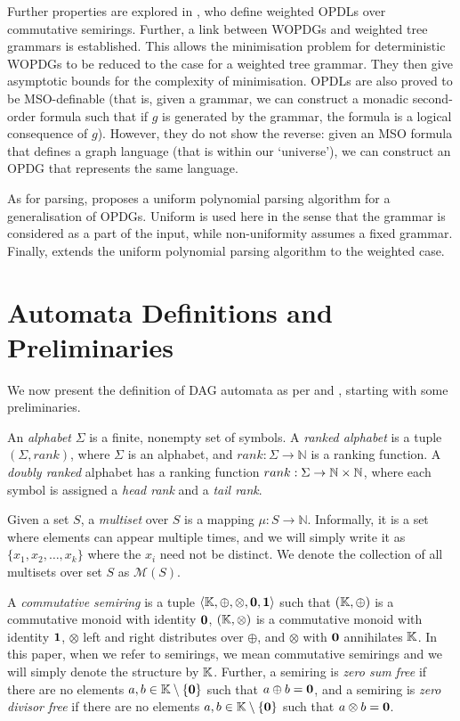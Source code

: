 \documentclass[11pt]{article}
\begin{document}
Further properties are explored in \cite{ericson3opdlweighted}, who define
weighted OPDLs over commutative semirings. Further, a link between WOPDGs and
weighted tree grammars is established. This allows the minimisation problem for
deterministic WOPDGs to be reduced to the case for a weighted tree grammar. They
then give asymptotic bounds for the complexity of minimisation. OPDLs are also
proved to be MSO-definable (that is, given a grammar, we can construct a monadic
second-order formula such that if $g$ is generated by the grammar, the formula
is a logical consequence of $g$). However, they do not show the reverse: given
an MSO formula that defines a graph language (that is within our `universe'), we
can construct an OPDG that represents the same language. 

As for parsing, \cite{ericson1opdl} proposes a uniform
polynomial parsing algorithm for a generalisation of OPDGs. Uniform is used here
in the sense that the grammar is considered as a part of the input, while
non-uniformity assumes a fixed grammar. Finally, \cite{parsing2} extends
the uniform polynomial parsing algorithm to the weighted case.


\section{Automata Definitions and Preliminaries}
We now present the definition of DAG automata as per \cite{chiang2018weighted}
and \cite{blum2019properties}, starting with some preliminaries.

An \textit{alphabet} $\Sigma$ is a finite, nonempty set of symbols. A
\textit{ranked alphabet} is a tuple $(\Sigma, rank)$, where $\Sigma$ is an
alphabet, and $ rank: \Sigma \rightarrow \mathbb{N} $ is a ranking function. A
\textit{doubly ranked} alphabet has a ranking function $ rank: \Sigma
\rightarrow \mathbb{N} \times \mathbb{N}$, where each symbol is assigned a \textit{head rank}
and a \textit{tail rank}. 

Given a set $S$, a \textit{multiset} over $S$ is a mapping $\mu: S \rightarrow
\mathbb{N}$. Informally, it is a set where elements can appear multiple times,
and we will simply write it as $\{x_1, x_2, \ldots, x_k\}$ where the $x_i$ need
not be distinct. We denote the collection of all multisets over set $S$ as
$\mathcal{M}(S)$. 

A \textit{commutative semiring} is a tuple $\langle \mathbb{K}, \oplus, \otimes,
\boldsymbol{0}, \boldsymbol{1} \rangle$ such that $(\mathbb{K}, \oplus)$ is a commutative monoid with
identity $\boldsymbol{0}$, $(\mathbb{K}, \otimes)$ is a commutative monoid with identity
$\boldsymbol{1}$, $\otimes$ left and right distributes over $\oplus$, and $\otimes$
with $\boldsymbol{0}$ annihilates $\mathbb{K}$. In this paper, when we refer to semirings, we
mean commutative semirings and we will simply denote the structure by $\mathbb{K}$.
Further, a semiring is \textit{zero sum free} if there are no elements $a,b \in
\mathbb{K} \setminus \{\boldsymbol{0}\}$ such that $a \oplus b = \boldsymbol{0}$, and a semiring is
\textit{zero divisor free} if there are no elements $a,b \in \mathbb{K} \setminus
\{\boldsymbol{0}\}$ such that $a \otimes b = \boldsymbol{0}$.
\end{document}
